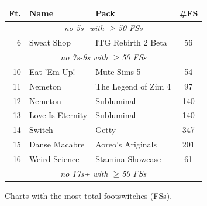 \documentclass[10pt]{sigplanconf}
\begin{document}
\begin{figure}[t]
	\begin{center}
		\small
	\begin{tabular}{r|l|l|c}
		\bf Ft. & \bf Name & \bf Pack & \bf \#FS \\
		\hline
		\multicolumn{4}{c}{\em no 5s- with $\ge$50 FSs} \\
		 6 & Sweat Shop       & ITG Rebirth 2 Beta    &  56 \\
		\multicolumn{4}{c}{\em no 7s-9s with $\ge$50 FSs} \\
		10 & Eat 'Em Up!      & Mute Sims 5           &  54 \\
		11 & Nemeton          & The Legend of Zim 4   &  97 \\
		12 & Nemeton          & Subluminal            & 140 \\
		13 & Love Is Eternity & Subluminal            & 140 \\
		14 & Switch           & Getty                 & 347 \\
		15 & Danse Macabre    & Aoreo's Ariginals     & 201 \\
		16 & Weird Science    & Stamina Showcase      &  61 \\
		\multicolumn{4}{c}{\em no 17s+ with $\ge$50 FSs} \\
	\end{tabular}
	\end{center}
	\caption{Charts with the most total footswitches (FSs).}
\end{figure}
\end{document}
